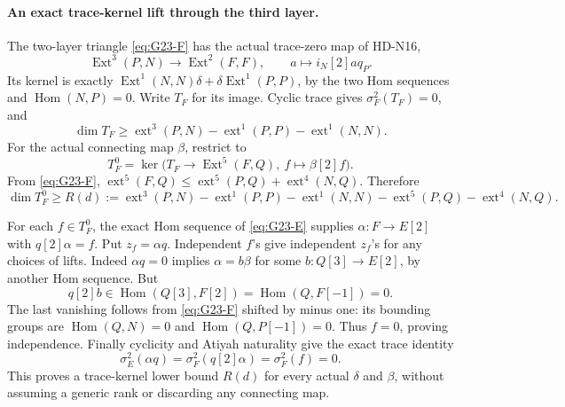 \paragraph{An exact trace-kernel lift through the third layer.}
The two-layer triangle \eqref{eq:G23-F} has the actual trace-zero
map of HD-N16,
\[
 \operatorname{Ext}^3(P,N)\longrightarrow\operatorname{Ext}^2(F,F),
 \qquad a\longmapsto i_N[2]a q_P.
\]
Its kernel is exactly
\(\operatorname{Ext}^1(N,N)\delta+
\delta\operatorname{Ext}^1(P,P)\), by the two Hom sequences
and \(\operatorname{Hom}(N,P)=0\). Write \(T_F\) for its
image. Cyclic trace gives \(\sigma_F^2(T_F)=0\), and
\[
 \dim T_F\ge
  \operatorname{ext}^3(P,N)-\operatorname{ext}^1(P,P)
                                  -\operatorname{ext}^1(N,N).
\]
For the actual connecting map \(\beta\), restrict to
\[
 T_F^0=\ker\bigl(T_F\longrightarrow\operatorname{Ext}^5(F,Q),
                                   \ f\longmapsto\beta[2]f\bigr).
\]
From \eqref{eq:G23-F},
\(\operatorname{ext}^5(F,Q)
\le\operatorname{ext}^5(P,Q)+\operatorname{ext}^4(N,Q)\).
Therefore
\begin{equation}\label{eq:G23-bound}
 \dim T_F^0\ge R(d):=
 \operatorname{ext}^3(P,N)-\operatorname{ext}^1(P,P)
 -\operatorname{ext}^1(N,N)-\operatorname{ext}^5(P,Q)
 -\operatorname{ext}^4(N,Q).
\end{equation}

For each \(f\in T_F^0\), the exact Hom sequence of
\eqref{eq:G23-E} supplies \(\alpha:F\to E[2]\) with
\(q[2]\alpha=f\). Put \(z_f=\alpha q\).
Independent \(f\)'s give independent \(z_f\)'s for any choices
of lifts. Indeed \(\alpha q=0\) implies
\(\alpha=b\beta\) for some \(b:Q[3]\to E[2]\), by another
Hom sequence. But
\[
 q[2]b\in\operatorname{Hom}(Q[3],F[2])
          =\operatorname{Hom}(Q,F[-1])=0.
\]
The last vanishing follows from \eqref{eq:G23-F} shifted by minus
one: its bounding groups are \(\operatorname{Hom}(Q,N)=0\)
and \(\operatorname{Hom}(Q,P[-1])=0\). Thus \(f=0\), proving
independence. Finally cyclicity and Atiyah naturality give the exact
trace identity
\[
               \sigma_E^2(\alpha q)=\sigma_F^2(q[2]\alpha)
                                      =\sigma_F^2(f)=0.
\]
This proves a trace-kernel lower bound \(R(d)\) for every actual
\(\delta\) and \(\beta\), without assuming a generic rank or
discarding any connecting map.

